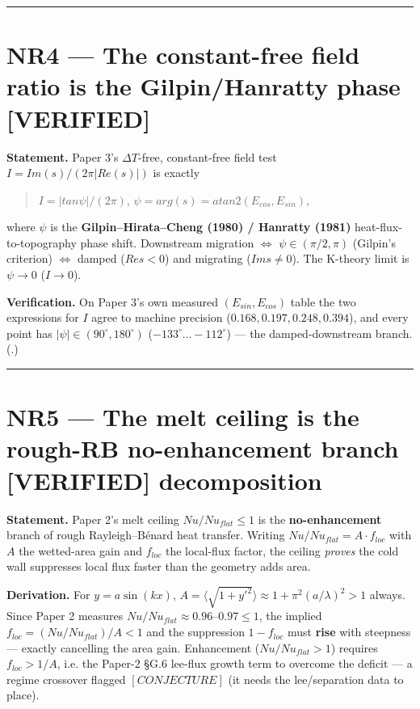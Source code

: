 \documentclass[11pt]{article}
\newcommand{\ctV}[1]{{\small\textbf{\textcolor{cVer}{[VERIFIED#1]}}}}
\begin{document}
\medskip\hrule\medskip


\section*{NR4 — The constant-free field ratio is the Gilpin/Hanratty phase \ctV{}}


\textbf{Statement.} Paper 3's $\Delta T$-free, constant-free field test $I = Im(s)/(2\pi |Re(s)|)$ is exactly


\begin{quote}
$I = |tan \psi | / (2\pi )$,   $\psi  = arg(s) = atan2(E_{cos}, E_{sin})$,
\end{quote}


where \ensuremath{\psi} is the \textbf{Gilpin–Hirata–Cheng (1980) / Hanratty (1981)} heat-flux-to-topography phase shift. Downstream migration \ensuremath{\Leftrightarrow} $\psi \in (\pi /2,\pi )$ (Gilpin's criterion) \ensuremath{\Leftrightarrow} damped ($Re s<0$) and migrating ($Im s\ne 0$). The K-theory limit is $\psi \to 0$ ($I\to 0$).


\textbf{Verification.} On Paper 3's own measured $(E_{sin},E_{cos})$ table the two expressions for $I$ agree to machine precision ($0.168, 0.197, 0.248, 0.394$), and every point has $|\psi |\in (90^{\circ},180^{\circ})$ ($-133^{\circ}\ldots -112^{\circ}$) — the damped-downstream branch. (.)


\medskip\hrule\medskip


\section*{NR5 — The melt ceiling is the rough-RB no-enhancement branch \ctV{} decomposition}


\textbf{Statement.} Paper 2's melt ceiling $Nu/Nu_{flat} \le  1$ is the \textbf{no-enhancement} branch of rough Rayleigh–Bénard heat transfer. Writing $Nu/Nu_{flat} = A\cdot f_{loc}$ with $A$ the wetted-area gain and $f_{loc}$ the local-flux factor, the ceiling \emph{proves} the cold wall suppresses local flux faster than the geometry adds area.


\textbf{Derivation.} For $y=a \sin(kx)$, $A=\langle \sqrt{1+y'^{2}}\rangle  \approx  1+\pi ^{2}(a/\lambda )^{2} > 1$ always. Since Paper 2 measures $Nu/Nu_{flat} \approx  0.96–0.97 \le  1$, the implied $f_{loc} = (Nu/Nu_{flat})/A < 1$ and the suppression $1-f_{loc}$ must \textbf{rise} with steepness — exactly cancelling the area gain. Enhancement ($Nu/Nu_{flat}>1$) requires $f_{loc}>1/A$, i.e. the Paper-2 §G.6 lee-flux growth term to overcome the deficit — a regime crossover flagged $[CONJECTURE]$ (it needs the lee/separation data to place).
\end{document}
